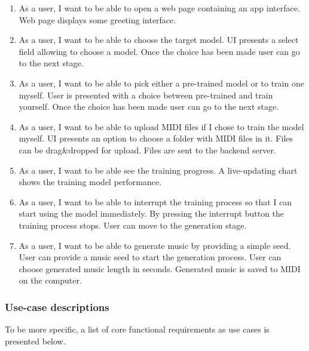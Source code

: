 \documentclass{article}
\begin{document}
\begin{enumerate}
    \item
          As a user, I want to be able to open a web page containing an app interface.
          \AC Web page displays some greeting interface.

    \item
          As a user, I want to be able to choose the target model.
          \AC UI presents a select field allowing to choose a model.
          \AC Once the choice has been made user can go to the next stage.

    \item
          As a user, I want to be able to pick either a pre-trained model or to train one myself.
          \AC User is presented with a choice between pre-trained and train yourself.
          \AC Once the choice has been made user can go to the next stage.

    \item
          As a user, I want to be able to upload MIDI files if I chose to train the model myself.
          \AC UI presents an option to choose a folder with MIDI files in it.
          \AC Files can be drag\&dropped for upload.
          \AC Files are sent to the backend server.

    \item
          As a user, I want to be able see the training progress.
          \AC A live-updating chart shows the training model performance.

    \item
          As a user, I want to be able to interrupt the training process so that I can start using the model immediately.
          \AC By pressing the interrupt button the training process stops.
          \AC User can move to the generation stage.

    \item
          As a user, I want to be able to generate music by providing a simple seed.
          \AC User can provide a music seed to start the generation process.
          \AC User can choose generated music length in seconds.
          \AC Generated music is saved to MIDI on the computer.
\end{enumerate}

\newpage
\subsubsection{Use-case descriptions}

To be more specific, a list of core functional requirements as use cases is presented below.
\end{document}
